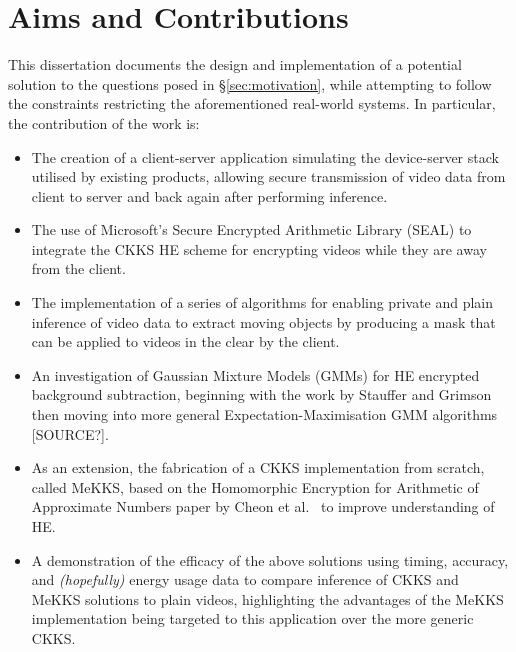 \setlength{\leftskip}{0cm}


\section{Aims and Contributions}
\label{sec:aimsAndContributions}
\setlength{\leftskip}{0.5cm}
\indent \indent
This dissertation documents the design and implementation of a potential solution to the questions posed in §\ref{sec:motivation}, while attempting to follow the constraints restricting the aforementioned real-world systems. In particular, the contribution of the work is:
\begin{itemize}
    \item The creation of a client-server application simulating the device-server stack utilised by existing products, allowing secure transmission of video data from client to server and back again after performing inference.
    \item The use of Microsoft's Secure Encrypted Arithmetic Library (SEAL) \cite{SEAL} to integrate the CKKS HE scheme \cite{CKKS} for encrypting videos while they are away from the client.
    \item The implementation of a series of algorithms for enabling private and plain inference of video data to extract moving objects by producing a mask that can be applied to videos in the clear by the client.
    \item An investigation of Gaussian Mixture Models (GMMs) for HE encrypted background subtraction, beginning with the work by Stauffer and Grimson \cite{Stauffer} then moving into more general Expectation-Maximisation GMM algorithms [SOURCE?].
    \item As an extension, the fabrication of a CKKS implementation from scratch, called MeKKS, based on the Homomorphic Encryption for Arithmetic of Approximate Numbers paper by Cheon et al.\ \cite{CKKS,BootstrappingHEAAN} to improve understanding of HE.
    \item A demonstration of the efficacy of the above solutions using timing, accuracy, and \textit{(hopefully)} energy usage data to compare inference of CKKS and MeKKS solutions to plain videos, highlighting the advantages of the MeKKS implementation being targeted to this application over the more generic CKKS.
\end{itemize}

\setlength{\leftskip}{0cm}
